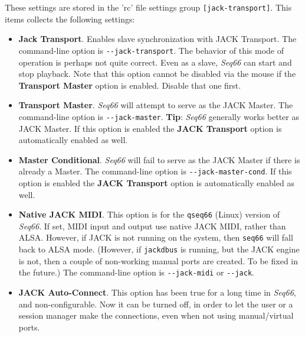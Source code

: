    \setcounter{ItemCounter}{0}      %

   These settings are stored in the 'rc' file settings group
   \texttt{[jack-transport]}.
   This items collects the following settings:

   \begin{itemize}
      \item \textbf{Jack Transport}.
         Enables slave synchronization with JACK Transport.
         The command-line option is \texttt{-{}-jack-transport}.
         The behavior of this mode of operation is perhaps not quite
         correct.  Even as a slave, \textsl{Seq66} can start and
         stop playback.
         Note that this option cannot be disabled via the mouse if the
         \textbf{Transport Master} option is enabled.  Disable that one first.
      \item \textbf{Transport Master}.
         \textsl{Seq66} will attempt to serve as the JACK Master.
         The command-line option is \texttt{-{}-jack-master}.
         \textbf{Tip}:
         \textsl{Seq66} generally works better as JACK Master.
         If this option is enabled the \textbf{JACK Transport} option is
         automatically enabled as well.
      \item \textbf{Master Conditional}.
         \textsl{Seq66} will fail to serve as the JACK Master if there is
         already a Master.
         The command-line option is \texttt{-{}-jack-master-cond}.
         If this option is enabled the \textbf{JACK Transport} option is
         automatically enabled as well.
      \item \textbf{Native JACK MIDI}.
         This option is for the \texttt{qseq66} (Linux) version of
         \textsl{Seq66}.
         If set, MIDI input and output use native JACK MIDI,
         rather than ALSA.  However, if JACK is not running on the
         system, then \texttt{seq66} will fall back to ALSA mode.
         (However, if \texttt{jackdbus} is running, but the JACK engine is not,
         then a couple of non-working manual ports are created.  To be fixed in
         the future.)
         The command-line option is \texttt{-{}-jack-midi}
         or \texttt{-{}-jack}.
      \item \textbf{JACK Auto-Connect}.
         This option has been true for a long time in \textsl{Seq66}, and
         non-configurable.  Now it can be turned off, in order to let the user
         or a session manager make the connections, even when not using
         manual/virtual ports.
   \end{itemize}


